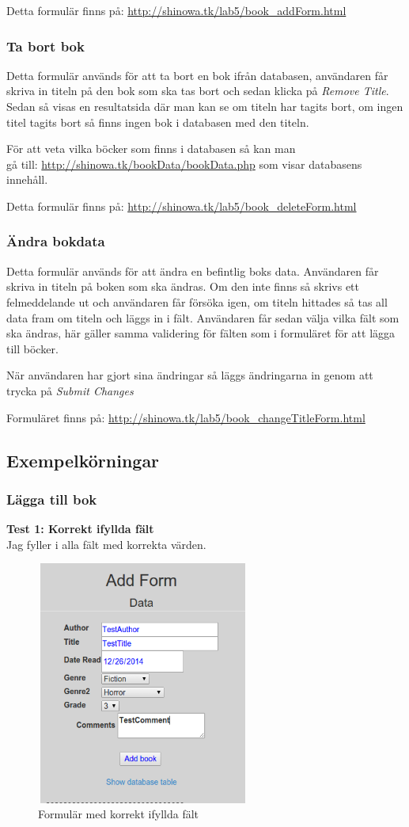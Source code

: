 \documentclass[11pt, titlepage, oneside, a4paper]{article}
\newcommand{\Subsection}[1]{\vspace{-4pt}\subsection{#1}\vspace{-8pt}}
\newcommand{\Subsubsection}[1]{\vspace{-4pt}\subsubsection{#1}\vspace{-8pt}}
\begin{document}
		Detta formulär finns på: \url{http://shinowa.tk/lab5/book_addForm.html}
		
		\Subsubsection{Ta bort bok}
		
		Detta formulär används för att ta bort en bok ifrån databasen, användaren får skriva in titeln på den bok som ska tas bort och sedan klicka på \emph{Remove Title}.
		Sedan så visas en resultatsida där man kan se om titeln har tagits bort, om ingen titel tagits bort så finns ingen bok i databasen med den titeln.
		
		För att veta vilka böcker som finns i databasen så kan man \\gå till: \url{http://shinowa.tk/bookData/bookData.php} som visar databasens innehåll.
		
		Detta formulär finns på: \url{http://shinowa.tk/lab5/book_deleteForm.html}
		
		\Subsubsection{Ändra bokdata}
		
		Detta formulär används för att ändra en befintlig boks data.
		Användaren får skriva in titeln på boken som ska ändras. Om den inte finns så skrivs ett felmeddelande ut och användaren får försöka igen, om titeln hittades
		så tas all data fram om titeln och läggs in i fält. Användaren får sedan välja vilka fält som ska ändras, här gäller samma validering för fälten som i formuläret för 
		att lägga till böcker. 
		
		När användaren har gjort sina ändringar så läggs ändringarna in genom att trycka på \emph{Submit Changes}
		
		Formuläret finns på: \url{http://shinowa.tk/lab5/book_changeTitleForm.html}
		
		\newpage
		\Subsection{Exempelkörningar}
		
		\Subsubsection{Lägga till bok}
		\textbf{Test 1: Korrekt ifyllda fält}\\
		Jag fyller i alla fält med korrekta värden.
		\begin{figure}[ht!]
		\centering
		\includegraphics[width=70mm, height=80mm]{del2_addbook.png}
		\caption{Formulär med korrekt ifyllda fält}
		\end{figure}
		
\end{document}
